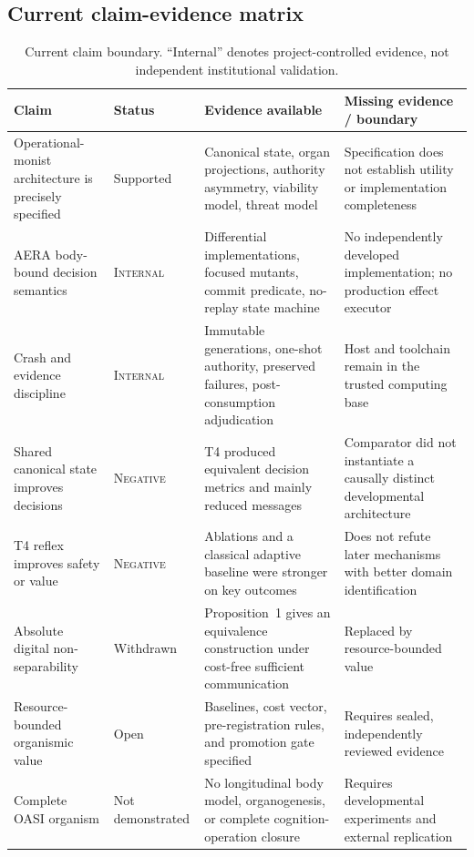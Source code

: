 \documentclass[journal,10pt]{IEEEtran}
\newcommand{\OASI}{\textsc{OASI}}
\newcommand{\AERA}{\textsc{AERA}}
\newcommand{\Internal}{\textsc{Internal}}
\newcommand{\Negative}{\textsc{Negative}}
\begin{document}
\subsection{Current claim-evidence matrix}
\begin{table}[t]
\centering
\caption{Current claim boundary. ``Internal'' denotes project-controlled evidence, not independent institutional validation.}
\label{tab:claims}
\small
\begin{tabularx}{\textwidth}{@{}p{3.15cm}p{1.55cm}X X@{}}
\toprule
Claim & Status & Evidence available & Missing evidence / boundary \\
\midrule
Operational-monist architecture is precisely specified & Supported & Canonical state, organ projections, authority asymmetry, viability model, threat model & Specification does not establish utility or implementation completeness \\
\AERA{} body-bound decision semantics & \Internal{} & Differential implementations, focused mutants, commit predicate, no-replay state machine & No independently developed implementation; no production effect executor \\
Crash and evidence discipline & \Internal{} & Immutable generations, one-shot authority, preserved failures, post-consumption adjudication & Host and toolchain remain in the trusted computing base \\
Shared canonical state improves decisions & \Negative{} & T4 produced equivalent decision metrics and mainly reduced messages & Comparator did not instantiate a causally distinct developmental architecture \\
T4 reflex improves safety or value & \Negative{} & Ablations and a classical adaptive baseline were stronger on key outcomes & Does not refute later mechanisms with better domain identification \\
Absolute digital non-separability & Withdrawn & Proposition~1 gives an equivalence construction under cost-free sufficient communication & Replaced by resource-bounded value \\
Resource-bounded organismic value & Open & Baselines, cost vector, pre-registration rules, and promotion gate specified & Requires sealed, independently reviewed evidence \\
Complete \OASI{} organism & Not demonstrated & No longitudinal body model, organogenesis, or complete cognition-operation closure & Requires developmental experiments and external replication \\
\bottomrule
\end{tabularx}
\end{table}
\end{document}
